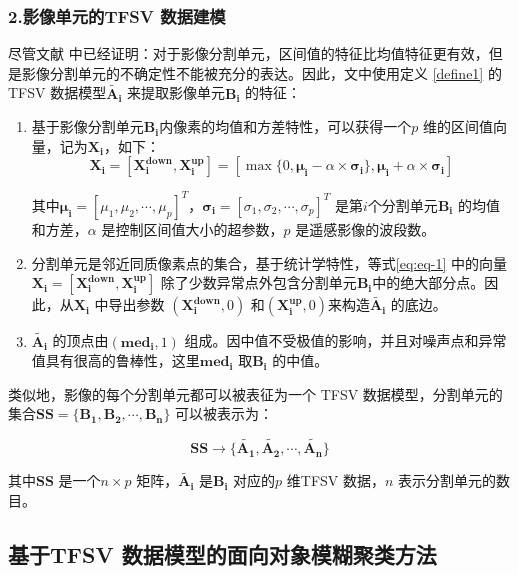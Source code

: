 \subsubsection*{2.影像单元的TFSV 数据建模}
尽管文献\cite{he2016remote} 中已经证明：对于影像分割单元，区间值的特征比均值特征更有效，但是影像分割单元的不确定性不能被充分的表达。因此，文中使用定义 \ref{define1} 的TFSV 数据模型$\bm{\tilde{A_i}}$  来提取影像单元$\bm{B_i}$ 的特征：
\begin{enumerate}[ 1)]
    \item 基于影像分割单元$\bm{B_i}$内像素的均值和方差特性，可以获得一个$p$ 维的区间值向量，记为$\bm{X_i}$，如下：
          \begin{equation}\label{eq:eq-1}
              \bm{X_i} = [\bm{X_{i}^{down}},\bm{X_i^{up} }] = [\max{\lbrace 0,\bm{\mu_i} - \alpha \times \bm{\sigma_i} \rbrace}, \bm{\mu_i} + \alpha \times \bm{\sigma_i}]
          \end{equation}

          其中$\bm{\mu_i} = [\mu_{1}, \mu_2,\cdots,\mu_p]^T$，$\bm{\sigma_i} = [\sigma_{1},\sigma_2,\cdots,\sigma_p] ^T$ 是第$i$个分割单元$\bm{B_i}$ 的均值和方差，$\alpha$ 是控制区间值大小的超参数，$p$ 是遥感影像的波段数。
    \item 分割单元是邻近同质像素点的集合，基于统计学特性，等式\ref{eq:eq-1} 中的向量$\bm{X_i} = [\bm{X_{i}^{down}},\bm{X_i^{up} }]$ 除了少数异常点外包含分割单元$\bm{B_i}$中的绝大部分点。因此，从$\bm{X_i}$ 中导出参数 $(\bm{X_{i}^{down}},0)$ 和$(\bm{X_i^{up}},0)$来构造$\bm{\tilde{A_i}}$ 的底边。
    \item $\bm{\tilde{A_i}}$ 的顶点由$(\bm{med_i},1)$ 组成。因中值不受极值的影响，并且对噪声点和异常值具有很高的鲁棒性，这里$\bm{med_i}$ 取$\bm{B_i}$ 的中值。
\end{enumerate}


类似地，影像的每个分割单元都可以被表征为一个 TFSV 数据模型，分割单元的集合$\bm{SS} = \lbrace \bm{B_1}, \bm{B_2},\bm{\cdots}, \bm{B_n} \rbrace$ 可以被表示为：

\begin{equation}\label{eq:eq-2}
    \bm{SS} \to \lbrace \bm{\tilde{A_1}}, \bm{\tilde{A_2}},\bm{\cdots}, \bm{\tilde{A_n}} \rbrace
\end{equation}

其中$\bm{SS}$ 是一个$n \times p$ 矩阵，$\bm{\tilde{A_i}}$ 是$\bm{B_i}$ 对应的$p$ 维TFSV 数据，$n$ 表示分割单元的数目。


\subsection{基于TFSV 数据模型的面向对象模糊聚类方法}
\label{subsec::chap03-3-2}


